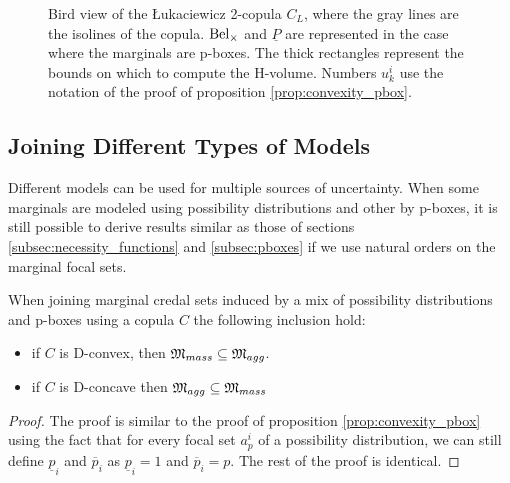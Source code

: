 \begin{figure}[!ht]
    \caption{Bird view of the \L ukaciewicz 2-copula $C_L$, where the gray lines are the isolines of the copula. ${\mathrm{Bel}}_\times$ and $\underline{P}$ are represented in the case where the marginals are p-boxes. The thick rectangles represent the bounds on which to compute the H-volume. Numbers $u^i_k$ use the notation of the proof of proposition \ref{prop:convexity_pbox}.}
    \label{fig:copula_convex}
\end{figure}

\subsection{Joining Different Types of Models}\label{subsec:multiple_models}
Different models can be used for multiple sources of uncertainty. When some marginals are modeled using possibility distributions and other by p-boxes, it is still possible to derive results similar as those of sections \ref{subsec:necessity_functions} and \ref{subsec:pboxes} if we use natural orders on the marginal focal sets. 
\begin{proposition}
    When joining marginal credal sets induced by a mix of possibility distributions and p-boxes using a copula $C$ the following inclusion hold:
    \begin{itemize}
        \item if $C$ is D-convex, then ${\mathfrak{M}}_{mass}\subseteq {\mathfrak{M}}_{agg}$.
        \item if $C$ is D-concave then ${\mathfrak{M}}_{agg}\subseteq{\mathfrak{M}}_{mass}$ 
    \end{itemize}
\end{proposition}

\begin{proof}
    The proof is similar to the proof of proposition \ref{prop:convexity_pbox} using the fact that for every focal set $a^i_p$ of a possibility distribution, we can still define $\underline{p}_i$ and $\overline{p}_i$ as $\underline{p}_i=1$ and $\overline{p}_i=p$. The rest of the proof is identical.
\end{proof}

